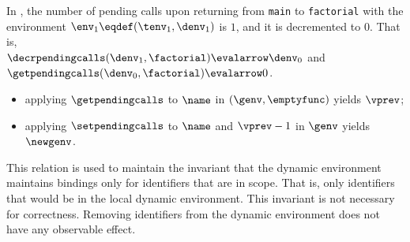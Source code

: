 
In , the number of pending calls upon returning from \verb|main| to \verb|factorial|
with the environment $\env_1 \eqdef (\tenv_1, \denv_1)$ is $1$, and it is decremented to $0$.
That is, \\
$\decrpendingcalls(\denv_1, \factorial) \evalarrow \denv_0$
and\\
$\getpendingcalls(\denv_0, \factorial) \evalarrow 0$.

\ProseParagraph
\AllApply
\begin{itemize}
  \item applying $\getpendingcalls$ to $\name$ in $(\genv, \emptyfunc)$ yields $\vprev$;
  \item applying $\setpendingcalls$ to $\name$ and $\vprev - 1$ in $\genv$ yields $\newgenv$.
\end{itemize}

\FormallyParagraph
\begin{mathpar}
\end{mathpar}

\ProseParagraph
{}

This relation is used to maintain the invariant that the dynamic environment
maintains bindings only for identifiers that are in scope. That is, only identifiers
that would be in the local dynamic environment.
%
This invariant is not necessary for correctness.
Removing identifiers from the dynamic environment does not have any
observable effect.


